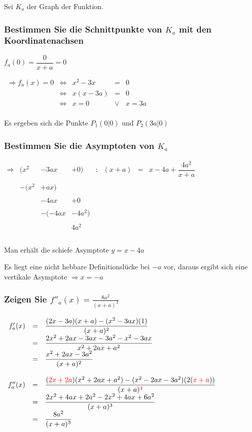 \documentclass[main.tex]{subfiles}
\begin{document}
Sei $K_{a}$ der Graph der Funktion.


\subsubsection{Bestimmen Sie die Schnittpunkte von $K_{a}$ mit den Koordinatenachsen}

$f_{a}(0)=\dfrac{0}{x+a} = 0$

$\begin{array}{rcccl}
	\Rightarrow f_{a}(x)=0 & \Leftrightarrow & x^2-3x & = & 0 \\
	&\Leftrightarrow & x(x-3a) & = & 0 \\
	&\Leftrightarrow & x=0 & \lor & x  =  3a  \\
\end{array}$

Es ergeben sich die Punkte $P_{1}(0|0)$ und $P_{2}(3a|0)$

\subsubsection{Bestimmen Sie die Asymptoten von $K_{a}$}

$\begin{array}{rccccccl}
	 \Rightarrow & (x^2 & -3ax & +0) & : & (x+a) &=& x - 4a +\dfrac{4a^2}{x+a} \\ \\
	& -(x^2 & +ax) & & & & & \\ \\
	& & -4ax & +0 & & & & \\ \\
	& & -(-4ax & -4a^2) & & & & \\ \\
	& & & 4a^2 & & & & \\ \\
\end{array}$

Man erhält die schiefe Asymptote $y=x-4a$

Es liegt eine nicht hebbare Definitionslücke bei $-a$ vor, daraus ergibt sich eine vertikale Asymptote $\Rightarrow x=-a$


\subsubsection{Zeigen Sie $f''_{a}(x) = \frac{8a^2}{(x+a)^3}$}

$\begin{array}{rcl}
	f'_{a}(x) &=& \dfrac{(2x-3a)(x+a) - (x^2-3ax)(1)}{(x+a)^2} \\
	&=& \dfrac{2x^2+2ax-3ax-3a^2-x^2-3ax}{x^2+2ax+a^2}\\
	&=& \dfrac{x^2+2ax-3a^2}{(x+a)^2}  \\ \\
	f''_{a}(x) &=& \dfrac{(\textcolor{red}{2x+2a})(x^2+2ax+a^2) - (x^2-2ax-3a^2)(2(\textcolor{red}{x+a}) ) }{(x+a)^{\textcolor{red}{4}}}  \\
	&=& \dfrac{2x^2+4ax+2a^2-2x^2+4ax+6a^2}{(x+a)^3}\\
	&=& \dfrac{8a^2}{(x+a)^3}
\end{array}$
\end{document}

